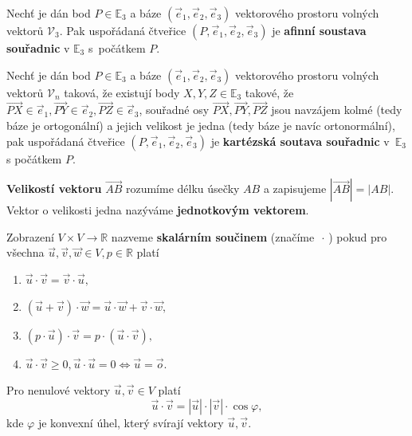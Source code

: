 \begin{definition}
    Nechť je dán bod $P\in \mathbb E_3$ a báze $(\vec e_1, \vec e_2, \vec e_3)$ vektorového
    prostoru volných vektorů $\mathscr V_3$. Pak uspořádaná čtveřice
    $(P, \vec e_1, \vec e_2, \vec e_3)$ je
    \textbf{afinní soustava souřadnic} v $\mathbb E_3$ s~počátkem $P$.
\end{definition}

\begin{definition}
    Nechť je dán bod $P\in \mathbb E_3$ a báze $(\vec e_1, \vec e_2, \vec e_3)$ vektorového
    prostoru volných vektorů $\mathscr V_n$ taková, že existují body $X,Y,Z\in \mathbb E_3$ takové, že
    $\overrightarrow{PX}\in\vec e_1,\overrightarrow{PY}\in\vec e_2,
    \overrightarrow{PZ}\in\vec e_3$, souřadné osy $\overrightarrow{PX},\overrightarrow{PY},
    \overrightarrow{PZ}$ jsou navzájem kolmé (tedy báze je ortogonální) a jejich velikost je jedna (tedy báze je navíc ortonormální),
    pak uspořádaná čtveřice $(P, \vec e_1, \vec e_2, \vec e_3)$ je \textbf{kartézská
    soutava souřadnic} v~$\mathbb E_3$ s počátkem $P$.
\end{definition}

\begin{definition}
\textbf{Velikostí vektoru} $\overrightarrow{AB}$ rozumíme délku úsečky $AB$ a zapisujeme
$|\overrightarrow{AB}| = |AB|.$ Vektor o velikosti jedna nazýváme \textbf{jednotkovým
vektorem}.
\end{definition}

\begin{definition}
Zobrazení $V\times V\to \mathbb R$ nazveme \textbf{skalárním součinem} (značíme $\,\cdot\,$) pokud pro všechna $\vec u, \vec v, \vec w \in V, p \in \mathbb R$ platí
\begin{enumerate}[$i.$]
\item $\vec u \cdot \vec v = \vec v \cdot \vec u,$
\item $(\vec u+\vec v)\cdot \vec w = \vec u\cdot \vec w + \vec v\cdot \vec w,$
\item $(p\cdot \vec u)\cdot \vec v = p\cdot(\vec u \cdot \vec v),$
\item $\vec u\cdot \vec v \geq 0, \vec u \cdot \vec u = 0 \iff \vec u = \vec o$.
\end{enumerate}
\end{definition}

\begin{veta}
    Pro nenulové vektory $\vec u, \vec v \in V$ platí
    $$\vec u \cdot \vec v = |\vec u|\cdot |\vec v|\cdot \cos \varphi,$$
    kde $\varphi$ je konvexní úhel, který svírají vektory $\vec u, \vec v.$
\end{veta}

